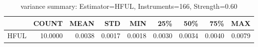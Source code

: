 \begin{table}[ht]
\centering
\caption{variance summary: Estimator=HFUL, Instruments=166, Strength=0.60}
\begin{tabular}{lrrrrrrrr}
\toprule
 & COUNT & MEAN & STD & MIN & 25\% & 50\% & 75\% & MAX \\
\midrule
HFUL & 10.0000 & 0.0038 & 0.0017 & 0.0018 & 0.0030 & 0.0034 & 0.0040 & 0.0079 \\
\bottomrule
\end{tabular}
\end{table}
